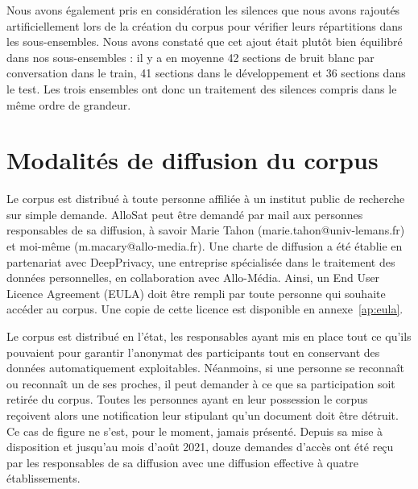 Nous avons également pris en considération les silences que nous avons rajoutés artificiellement lors de la création du corpus pour vérifier leurs répartitions dans les sous-ensembles.
Nous avons constaté que cet ajout était plutôt bien équilibré dans nos sous-ensembles : il y a en moyenne 42 sections de bruit blanc par conversation dans le train, 41 sections dans le développement et 36 sections dans le test.
Les trois ensembles ont donc un traitement des silences compris dans le même ordre de grandeur.

\section{Modalités de diffusion du corpus}
Le corpus est distribué à toute personne affiliée à un institut public de recherche sur simple demande. %
AlloSat peut être demandé par mail aux personnes responsables de sa diffusion, à savoir Marie Tahon (marie.tahon@univ-lemans.fr) et moi-même (m.macary@allo-media.fr). Une charte de diffusion a été établie en partenariat avec DeepPrivacy, une entreprise spécialisée dans le traitement des données personnelles, en collaboration avec Allo-Média. Ainsi, un End User Licence Agreement (EULA) doit être rempli par toute personne qui souhaite accéder au corpus. Une copie de cette licence est disponible en annexe~\ref{ap:eula}.

Le corpus est distribué en l'état, les responsables ayant mis en place tout ce qu'ils pouvaient pour garantir l'anonymat des participants tout en conservant des données automatiquement exploitables. Néanmoins, si une personne se reconnaît ou reconnaît un de ses proches, il peut demander à ce que sa participation soit retirée du corpus.
Toutes les personnes ayant en leur possession le corpus reçoivent alors une notification leur stipulant qu'un document doit être détruit. Ce cas de figure ne s'est, pour le moment, jamais présenté.
Depuis sa mise à disposition et jusqu'au mois d’août 2021, douze demandes d'accès ont été reçu par les responsables de sa diffusion avec une diffusion effective à quatre établissements.


